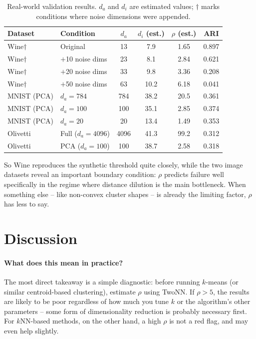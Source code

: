 \documentclass[pdflatex,sn-mathphys-num]{sn-jnl}
\theoremstyle{thmstyleone}
\begin{document}
\begin{table}[h]
\centering
\caption{Real-world validation results. $d_a$ and $d_i$ are estimated values; $\dagger$ marks conditions where noise dimensions were appended.}
\label{tab:realdata}
\begin{tabular}{llcccc}
\toprule
Dataset & Condition & $d_a$ & $d_i$ (est.) & $\rho$ (est.) & ARI \\
\midrule
Wine$\dagger$ & Original            & 13  & 7.9  & 1.65 & 0.897 \\
Wine$\dagger$ & $+$10 noise dims    & 23  & 8.1  & 2.84 & 0.621 \\
Wine$\dagger$ & $+$20 noise dims    & 33  & 9.8  & 3.36 & 0.208 \\
Wine$\dagger$ & $+$50 noise dims    & 63  & 10.2 & 6.18 & 0.041 \\
\midrule
MNIST (PCA)  & $d_a = 784$ & 784 & 38.2 & 20.5 & 0.361 \\
MNIST (PCA)  & $d_a = 100$ & 100 & 35.1 & 2.85 & 0.374 \\
MNIST (PCA)  & $d_a = 20$  & 20  & 13.4 & 1.49 & 0.353 \\
\midrule
Olivetti     & Full ($d_a=4096$) & 4096 & 41.3 & 99.2 & 0.312 \\
Olivetti     & PCA ($d_a=100$)   & 100  & 38.7 & 2.58 & 0.318 \\
\bottomrule
\end{tabular}
\end{table}

So Wine reproduces the synthetic threshold quite closely, while the two image
datasets reveal an important boundary condition: $\rho$ predicts failure well
specifically in the regime where distance dilution is the main bottleneck. When
something else -- like non-convex cluster shapes -- is already the limiting
factor, $\rho$ has less to say.

\section{Discussion}

\paragraph{What does this mean in practice?}
The most direct takeaway is a simple diagnostic: before running $k$-means (or
similar centroid-based clustering), estimate $\rho$ using TwoNN. If
$\rho > 5$, the results are likely to be poor regardless of how much you tune
$k$ or the algorithm's other parameters -- some form of dimensionality
reduction is probably necessary first. For $k$NN-based methods, on the other
hand, a high $\rho$ is not a red flag, and may even help slightly.
\end{document}
